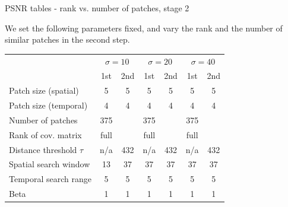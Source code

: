 \documentclass[mathserif, 8pt]{beamer}
\begin{document}
\begin{frame}{PSNR tables - rank vs. number of patches, stage 2}

	We set the following parameters fixed, and vary the rank and the number of similar
	patches in the second step.

	\begin{center}
	\begin{tabular}{l | c c | c c | c c }
		& \multicolumn{2}{c|}{$\sigma = 10$} 
		& \multicolumn{2}{c|}{$\sigma = 20$} 
		& \multicolumn{2}{c}{$\sigma = 40$} \\
		                            & 1st  & 2nd  & 1st  & 2nd  & 1st  & 2nd \\\hline\hline
		Patch size (spatial)        &  5   &   5  &  5   &   5  &  5   &   5 \\
		Patch size (temporal)       &  4   &   4  &  4   &   4  &  4   &   4 \\
		Number of patches           & 375  &      & 375  &      & 375  &     \\
		Rank of cov. matrix         & full &      & full &      & full &     \\
		Distance threshold $\tau$   & n/a  & 432  & n/a  & 432  & n/a  & 432 \\
		Spatial search window       & 13   & 37   & 37   & 37   & 37   & 37  \\
		Temporal search range       & 5    & 5    & 5    & 5    & 5    & 5   \\\hline
		Beta                        & 1    & 1    & 1    & 1    & 1    & 1   \\\hline
	\end{tabular}
	\end{center}

\end{frame}
\end{document}
